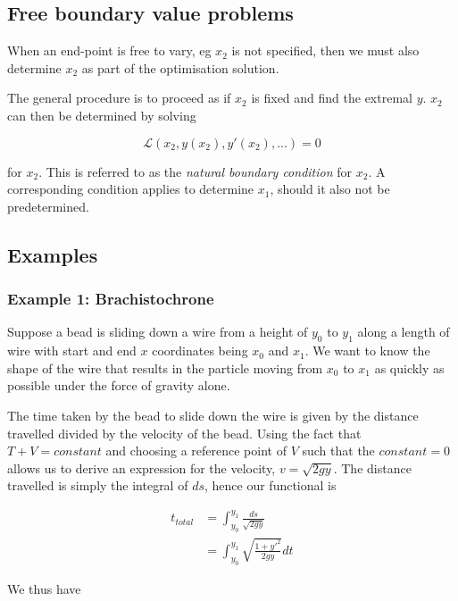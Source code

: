 \documentclass[]{article}
\begin{document}
\subsection{Free boundary value problems}
When an end-point is free to vary, eg $x_{2}$ is not specified, then we must also determine $x_{2}$ as part of the optimisation solution.

The general procedure is to proceed as if $x_{2}$ is fixed and find the extremal $y$. $x_{2}$ can then be determined by solving

\begin{equation} \mathcal{L}(x_{2}, y(x_{2}), y'(x_{2}),...) = 0\end{equation}

for $x_{2}$. This is referred to as the\textit{ natural boundary condition} for $x_{2}$. A corresponding condition applies to determine $x_{1}$, should it also not be predetermined.

\subsection{Examples}

\subsubsection{Example 1: Brachistochrone}
Suppose a bead is sliding down a wire from a height of $y_{0}$ to $y_{1}$ along a length of wire with start and end $x$ coordinates being $x_{0}$ and $x_{1}$. We want to know the shape of the wire that results in the particle moving from $x_{0}$ to $x_{1}$ as quickly as possible under the force of gravity alone.

The time taken by the bead to slide down the wire is given by the distance travelled divided by the velocity of the bead. Using the fact that $T + V = constant$ and choosing a reference point of $V$ such that the $constant = 0$ allows us to derive an expression for the velocity, $v = \sqrt{2gy}$. The distance travelled is simply the integral of $ds$, hence our functional is

\begin{equation} \begin{split} t_{total} & =  \int_{y_{0}} ^{y_{1}} \frac{ds}{\sqrt{2gy}} \\
& = \int_{y_{0}} ^{y_{1}} \sqrt{\frac{1+y'^{2}}{2gy}}dt \end{split} \end{equation}

We thus have 
\end{document}

